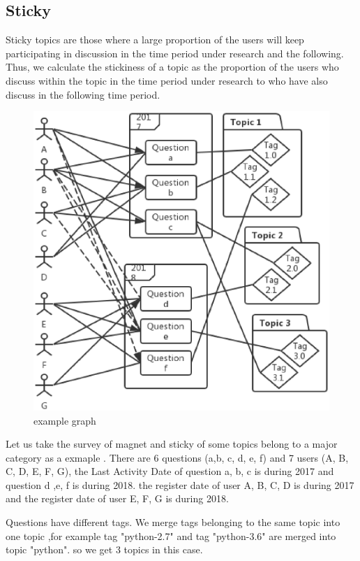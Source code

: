 \documentclass[conference]{IEEEtran}
\begin{document}
\subsection*{Sticky}
Sticky topics are those where a large proportion of the users will keep participating in discussion in the time period under research and the following. Thus, we calculate the stickiness of a topic as the proportion of the users who discuss within the topic in the time period under research to who have also discuss in the following time period.

\begin{figure}[t]
 \centering
 \includegraphics[width=.9\hsize]{img/examplegraph1.eps}  
 \caption{example graph} 
 \label{fig:example1} 
\end{figure}


Let us take the survey of magnet and sticky of some topics belong to a major category as a exmaple . There are 6 questions (a,b, c, d, e, f) and 7 users (A, B, C, D, E, F, G), the Last Activity Date of question a, b, c is during 2017 and question d ,e, f is during 2018. the register date of user A, B, C, D is during 2017 and the register date of user E, F, G is during 2018.

Questions have different tags. We merge tags belonging to the same topic into one topic ,for example tag "python-2.7" and tag "python-3.6" are merged into topic "python". so we get 3 topics in this case.
\end{document}

